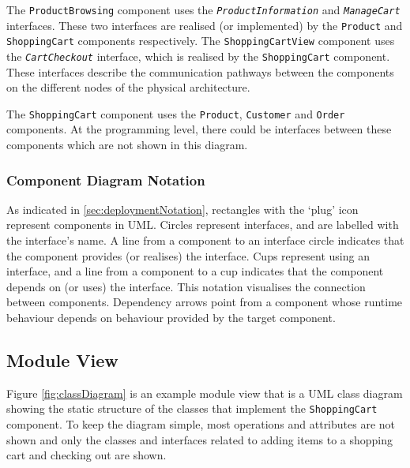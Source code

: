The \texttt{ProductBrowsing} component uses the \texttt{\textsl{ProductInformation}} and \texttt{\textsl{ManageCart}} interfaces.
These two interfaces are realised (or implemented) by the \texttt{Product} and \texttt{ShoppingCart} components respectively.
The \texttt{ShoppingCartView} component uses the \texttt{\textsl{CartCheckout}} interface, which is realised by the \texttt{ShoppingCart} component.
These interfaces describe the communication pathways between the components on the different nodes of the physical architecture.

The \texttt{ShoppingCart} component uses the \texttt{Product}, \texttt{Customer} and \texttt{Order} components.
At the programming level, there could be interfaces between these components which are not shown in this diagram.

\subsubsection{Component Diagram Notation}\label{sec:componentNotation}
As indicated in \ref{sec:deploymentNotation}, rectangles with the `plug' icon represent components in UML.
Circles represent interfaces, and are labelled with the interface's name.
A line from a component to an interface circle indicates that the component provides (or realises) the interface.
Cups represent using an interface, and a line from a component to a cup indicates that the component depends on (or uses) the interface.
This notation visualises the connection between components.
Dependency arrows point from a component whose runtime behaviour depends on behaviour provided by the target component.

\subsection{Module View}
Figure \ref{fig:classDiagram} is an example module view that is a UML class diagram showing the static structure of the classes that implement the \texttt{ShoppingCart} component.
To keep the diagram simple, most operations and attributes are not shown and only the classes and interfaces related to adding items to a shopping cart and checking out are shown.

